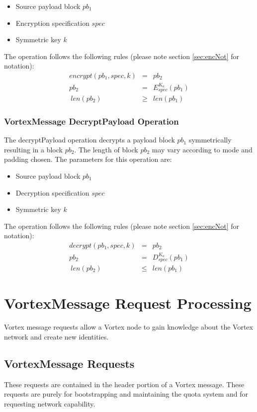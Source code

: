 \begin{itemize}
	\item Source payload block $pb_1$
	\item Encryption specification $spec$
	\item Symmetric key $k$
\end{itemize}

The operation follows the following rules (please note section \ref{sec:encNot} for notation):
\begin{eqnarray}
encrypt(pb_1, spec, k) & = & pb_2 \\
pb_2 & = & E_{spec}^{K_a}\left( pb_1 \right)\\\
len(pb_2) & \geq & len(pb_1)
\end{eqnarray}


\subsubsection{VortexMessage DecryptPayload Operation}
The decryptPayload operation decrypts a payload block $pb_1$ symmetrically resulting in a block $pb_2$. The length of block $pb_2$ may vary according to mode and padding chosen. The parameters for this operation are:

\begin{itemize}
	\item Source payload block $pb_1$
	\item Decryption specification $spec$
	\item Symmetric key $k$
\end{itemize}

The operation follows the following rules (please note section \ref{sec:encNot} for notation):
\begin{eqnarray}
decrypt(pb_1, spec, k) & = & pb_2 \\
pb_2 & = & D_{spec}^{K_a}\left( pb_1 \right)\\\
len(pb_2) & \leq & len(pb_1)
\end{eqnarray}


\section{VortexMessage Request Processing}
Vortex message requests allow a Vortex node to gain knowledge about the Vortex network and create new identities.

\fxfatal{add content here}

\subsection{VortexMessage Requests}
These requests are contained in the header portion of a Vortex message. These requests are purely for bootstrapping and maintaining the quota system and for requesting network capability.

